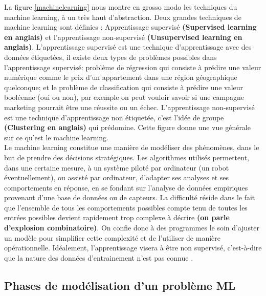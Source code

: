 \documentclass[12pt, french]{report}
\begin{document}
La figure \ref{machinelearning} nous montre en grosso modo les techniques du machine learning, à un très haut d'abstraction. Deux grandes techniques de machine learning sont définies : Apprentissage supervisé \textbf{(Supervised learning en anglais)} et l'apprentissage non-supervisé \textbf{(Unsupervised learning en anglais)}. L'apprentissage supervisé est une technique d'apprentissage avec des données étiquetées, il existe deux types de problèmes possibles dans l'apprentissage supervisé: problème de régression qui consiste à prédire une valeur numérique comme le prix d'un appartement dans une région géographique quelconque; et le problème de classification qui consiste à prédire une valeur booléenne (oui ou non), par exemple on peut vouloir savoir si une campagne marketing pourrait être une réussite ou un échec. L'apprentissage non-supervisé est une technique d'apprentissage non étiquetée, c'est l'idée de groupe \textbf{(Clustering en anglais)} qui prédomine.  Cette figure donne une vue générale sur ce qu'est le machine learning.\\

Le machine learning constitue une manière de modéliser des phénomènes, dans le but de prendre des décisions stratégiques. Les algorithmes utilisés permettent, dans une certaine mesure, à un système piloté par ordinateur (un robot éventuellement), ou assisté par ordinateur, d'adapter ses analyses et ses comportements en réponse, en se fondant sur l'analyse de données empiriques provenant d'une base de données ou de capteurs. La difficulté réside dans le fait que l'ensemble de tous les comportements possibles compte tenu de toutes les entrées possibles devient rapidement trop complexe à décrire \textbf{(on parle d'explosion combinatoire)}. On confie donc à des programmes le soin d'ajuster un modèle pour simplifier cette complexité et de l'utiliser de manière opérationnelle. Idéalement, l'apprentissage visera à être non supervisé, c'est-à-dire que la nature des données d'entrainement n'est pas connue \cite{key13}.

\subsection{Phases de modélisation d'un problème ML}
\end{document}
